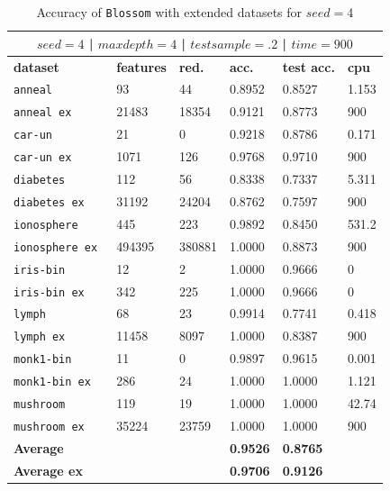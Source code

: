 \documentclass[12pt]{report}
\theoremstyle{definition}
\theoremstyle{definition}
\theoremstyle{definition}
\begin{document}
\begin{table}[ht]
    \centering
    \begin{tabular}{L{3.5cm} R{1.8cm} R{1.8cm} R{1.8cm} R{1.8cm} R{1.8cm}}
        \hline
         \\
        \hline
        \bf dataset & \bf features & \bf red. & \bf acc. & \bf test acc. & \bf cpu \\
        \hline
        \tt anneal & 93 & 44 & 0.8952 &	0.8527 & 1.153 \\
        \tt anneal ex & 21483 &	18354 &	0.9121 & 0.8773 & 900 \\
        \tt car-un & 21 & 0 & 0.9218 & 0.8786 & 0.171 \\
        \tt car-un ex & 1071 & 126 & 0.9768 & 0.9710 & 900 \\
        \tt diabetes & 112 & 56 & 0.8338 & 0.7337 & 5.311 \\
        \tt diabetes ex & 31192 & 24204 & 0.8762 & 0.7597 & 900 \\
        \tt ionosphere & 445 & 223 & 0.9892 & 0.8450 & 531.2 \\
        \tt ionosphere ex & 494395 & 380881 & 1.0000 & 0.8873 & 900 \\
        \tt iris-bin & 12 &	2 &	1.0000 & 0.9666 & 0 \\
        \tt iris-bin ex & 342 &	225 & 1.0000 & 0.9666 & 0 \\
        \tt lymph & 68 & 23 & 0.9914 & 0.7741 & 0.418 \\
        \tt lymph ex & 11458 & 8097	& 1.0000 & 0.8387 & 900 \\
        \tt monk1-bin & 11 & 0 & 0.9897 & 0.9615 & 0.001 \\
        \tt monk1-bin ex & 286 & 24 & 1.0000 & 1.0000 & 1.121 \\
        \tt mushroom & 119 & 19 & 1.0000 & 1.0000 & 42.74 \\
        \tt mushroom ex & 35224 & 23759	& 1.0000 & 1.0000 & 900 \\
        \hline
        \bf Average & & & \bf 0.9526 & \bf 0.8765 & \\
        \hline
        \bf Average ex & & & \bf 0.9706 & \bf 0.9126 & \\
        \hline
    \end{tabular}
    \caption{Accuracy of \texttt{Blossom} with extended datasets for $seed=4$}
    \label{fig:seed4}
\end{table}
\end{document}
